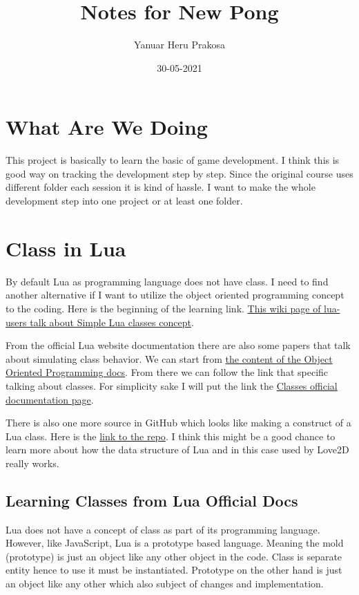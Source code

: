 \documentclass{article}
\title{Notes for New Pong}
\author{Yanuar Heru Prakosa}
\date{30-05-2021}
\begin{document}
    \maketitle

    \section{What Are We Doing}
    This project is basically to learn the basic of game development.
    I think this is good way on tracking the development step by step.
    Since the original course uses different folder each session it is kind of hassle.
    I want to make the whole development step into one project or at least one folder. 

    \section{Class in Lua}
    By default Lua as programming language does not have class. 
    I need to find another alternative if I want to utilize the object oriented programming concept to the coding. 
    Here is the beginning of the learning link. 
    \href{http://lua-users.org/wiki/SimpleLuaClasses}{This wiki page of lua-users talk about Simple Lua classes concept}.

    From the official Lua website documentation there are also some papers that talk about simulating class behavior.
    We can start from \href{https://www.lua.org/pil/contents.html#16}{the content of the Object Oriented Programming docs}.
    From there we can follow the link that specific talking about classes. 
    For simplicity sake I will put the link the \href{https://www.lua.org/pil/16.1.html}{Classes official documentation page}.

    There is also one more source in GitHub which looks like making a construct of a Lua class. Here is the \href{https://github.com/jonstoler/class.lua}{link to the repo}. 
    I think this might be a good chance to learn more about how the data structure of Lua and in this case used by Love2D really works.

    \subsection{Learning Classes from Lua Official Docs}
    Lua does not have a concept of class as part of its programming language. However, like JavaScript, Lua is a prototype based language. 
    Meaning the mold (prototype) is just an object like any other object in the code. 
    Class is separate entity hence to use it must be instantiated. Prototype on the other hand is just an object like any other which also subject of changes and implementation.
\end{document}
